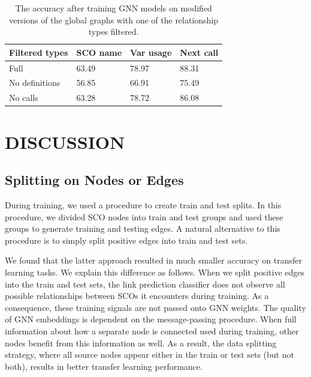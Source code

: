 \documentclass[a4paper,twoside]{article}
\begin{document}
\begin{table}[]
\centering
\begin{tabular}{p{1.8cm}p{1.3cm}p{1.4cm}p{1.32cm}}
\toprule
\textbf{Filtered types} & \textbf{SCO name} & \textbf{Var usage} & \textbf{Next call} \\\midrule
Full                         & 63.49             & 78.97              & 88.31              \\\midrule
No definitions            & 56.85             & 66.91              & 75.49              \\\midrule
No calls                     & 63.28             & 78.72              & 86.08    \\         \bottomrule
\end{tabular}
\caption{The accuracy after training GNN models on modified versions of the global graphs with one of the relationship types filtered.}
\label{tbl:ablation}
\end{table}


\section{\uppercase{Discussion}}\label{sec:discuss}

\subsection{Splitting on Nodes or Edges}

During training, we used a procedure to create train and test splits. In this procedure, we divided SCO nodes into train and test groups and used these groups to generate training and testing edges. A natural alternative to this procedure is to simply split positive edges into train and test sets.

We found that the latter approach resulted in much smaller accuracy on transfer learning tasks. We explain this difference as follows. When we split positive edges into the train and test sets, the link prediction classifier does not observe all possible relationships between SCOs it encounters during training. As a consequence, these training signals are not passed onto GNN weights. The quality of GNN embeddings is dependent on the message-passing procedure. When full information about how a separate node is connected used during training, other nodes benefit from this information as well. As a result, the data splitting strategy, where all source nodes appear either in the train or test sets (but not both), results in better transfer learning performance. 
\end{document}

